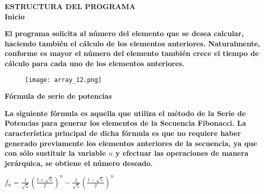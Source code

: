 \documentclass[letterpaper]{article}
\begin{document}
\clearpage

\begin{center}
\textbf{\LARGE ESTRUCTURA DEL PROGRAMA\\}
\vspace{1.0cm}
\textbf{\LARGE Inicio\\}
\vspace{0.5cm}
\end{center}

\begin{flushleft}
\textbf{\Large El programa solicita al n\'umero del elemento que se desea calcular, haciendo tambi\'en el c\'alculo de los elementos anteriores. Naturalmente,\\ conforme es mayor el n\'umero del elemento tambi\'en crece el tiempo de c\'alculo para cada uno de los elementos anteriores.\\}
\vspace{0.5cm}
\end{flushleft}

\begin{center}
\begin{figure}[H] %
\texttt{[image: array\_12.png]}
\end{figure}
\end{center}

\clearpage

\begin{center}
\textbf{\LARGE F\'ormula de serie de potencias\\}
\vspace{0.5cm}
\end{center}

\begin{flushleft}
\textbf{\Large La siguiente f\'ormula es aquella que utiliza el m\'etodo de la Serie de Potencias para generar los elementos de la Secuencia Fibonacci. La caracter\'istica principal de dicha f\'ormula es que no requiere haber generado previamente los elementos anteriores de la secuencia, ya que con s\'olo sustituir la variable $n$ y efectuar las operaciones de manera jer\'arquica, se obtiene el n\'umero deseado.\\}
\vspace{0.5cm}
\end{flushleft}
\begin{center}
\textbf{\huge $f_n=\frac1{\sqrt5}\left(\frac{1+\sqrt5}2\right)^n-\frac1{\sqrt5}\left(\frac{1-\sqrt5}2\right)^n$\\}
\vspace{1.0cm}
\end{center}
\end{document}
